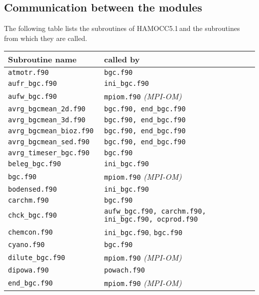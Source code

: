 \documentclass[11pt,a4paper,fleqn,twoside]{article}
\newcommand{\ham}{HAMOCC5.1\,}
\begin{document}
\clearpage
\newpage
\begin{appendix}

\section{\label{commulication_between_modules}Communication between the
modules}

The following table lists the subroutines of \ham and the subroutines from
which they are called. \\

\footnotesize
\begin{tabular}{l|l} 
Subroutine name          &called by \\ \hline
{\tt atmotr.f90      }&  {\tt bgc.f90}    \\
{\tt aufr\_bgc.f90         }&  {\tt ini\_bgc.f90}    \\
{\tt aufw\_bgc.f90         }&  {\tt mpiom.f90} {\em (MPI-OM)}   \\
{\tt  avrg\_bgcmean\_2d.f90 }&   {\tt bgc.f90, end\_bgc.f90}   \\ 
{\tt  avrg\_bgcmean\_3d.f90 }&   {\tt bgc.f90, end\_bgc.f90}   \\ 
{\tt  avrg\_bgcmean\_bioz.f90 }&   {\tt bgc.f90, end\_bgc.f90}   \\ 
{\tt  avrg\_bgcmean\_sed.f90 }&   {\tt bgc.f90, end\_bgc.f90}   \\ 
{\tt avrg\_timeser\_bgc.f90   }&  {\tt bgc.f90}  \\ 
{\tt beleg\_bgc.f90        }&  {\tt ini\_bgc.f90}   \\
{\tt bgc.f90              }&  {\tt mpiom.f90} {\em (MPI-OM)}   \\
{\tt  bodensed.f90        }&  {\tt ini\_bgc.f90}    \\ 
{\tt  carchm.f90          }&  {\tt bgc.f90}   \\
{\tt  chck\_bgc.f90        }&  {\tt aufw\_bgc.f90, carchm.f90, ini\_bgc.f90, ocprod.f90 } \\
{\tt  chemcon.f90          }&  {\tt ini\_bgc.f90}, {\tt bgc.f90}    \\
{\tt  cyano.f90           }&  {\tt bgc.f90}   \\ 
{\tt  dilute\_bgc.f90      }&  {\tt mpiom.f90} {\em (MPI-OM)}     \\
{\tt  dipowa.f90          }&  {\tt powach.f90}    \\ 
{\tt  end\_bgc.f90         }&  {\tt mpiom.f90} {\em (MPI-OM)}   \\ 

\end{tabular}
\end{appendix}
\end{document}
